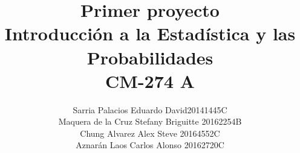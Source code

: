 \titlehead{%
	\centering\hspace*{-0.55cm}\texttt{[image: 1]}
}
\theoremstyle{definition}
\newtheorem{definition}{Definición}
\newtheorem{theorem}{Teorema}
\newtheorem{corollary}{Corolario}

\usepackage{xpatch}
\makeatletter
{}
\makeatother

\author{
	Sarria Palacios Eduardo David\quad\hfill 20141445C\\
	Maquera de la Cruz Stefany Briguitte		\quad\hfill 20162254B\\
	Chung Alvarez Alex Steve	\quad\hfill 20164552C\\
	Aznarán Laos Carlos Alonso	\quad\hfill 20162720C\\
}
\title{Primer proyecto\\
	Introducción a la Estadística y las Probabilidades\\
	CM-274 A}



\settitle
